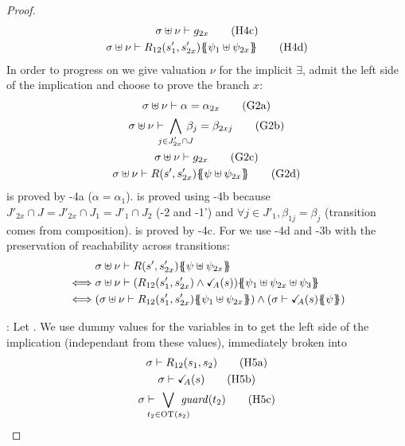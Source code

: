 \documentclass{article}
\begin{document}
\begin{proof}
\begin{gather}
		\sigma \uplus \nu \vdash g_{2x} \hyp{4c} \\
		\sigma \uplus \nu \vdash R_{12}\mpar{s'_1, s'_{2x}}\psubst{\psi_1 \uplus \psi_{2x}} \hyp{4d}
	\end{gather}
	In order to progress on  we give valuation \(\nu\) for the implicit \(\exists\), admit the left side of the implication and choose to prove the branch \(x\):
	\begin{gather}
		\sigma \uplus \nu \vdash \alpha = \alpha_{2x} \goal{2a} \\
		\sigma \uplus \nu \vdash \bigwedge_\subbox{j \in J'_{2x} \cap J} \beta_j = \beta_{2xj} \goal{2b} \\
		\sigma \uplus \nu \vdash g_{2x} \goal{2c} \\
		\sigma \uplus \nu \vdash R\mpar{s', s'_{2x}}\psubst{\psi \uplus \psi_{2x}} \goal{2d}
	\end{gather}
	 is proved by \hyp{4a} (\(\alpha = \alpha_1\)).
	 is proved using \hyp{4b} because \(J'_{2x} \cap J = J'_{2x} \cap J_1 = J'_1 \cap J_2\) (\hyp{2} and \hyp{1'}) and \(\forall j \in J'_1, \beta_{1j} = \beta_j\) (transition comes from composition).
	 is proved by \hyp{4c}.
	For  we use \hyp{4d} and \hyp{3b} with the preservation of reachability across transitions:
	\begin{align*}
		& \sigma \uplus \nu \vdash R\mpar{s', s'_{2x}}\psubst{\psi \uplus \psi_{2x}} \\
		\iff & \sigma \uplus \nu \vdash \mpar{R_{12}\mpar{s'_1, s'_{2x}} \wedge \reach{A}\mpar{s}}\psubst{\psi_1 \uplus \psi_{2x} \uplus \psi_3} \\
		\iff & \mpar{\sigma \uplus \nu \vdash R_{12}\mpar{s'_1, s'_{2x}}\psubst{\psi_1 \uplus \psi_{2x}}} \wedge \mpar{\sigma \vdash \reach{A}\mpar{s}\psubst{\psi}}
	\end{align*}
\item[\goal{1}:]
	Let .
	We use dummy values for the variables in  to get the left side of the implication (independant from these values), immediately broken into
	\begin{gather}
		\sigma \vdash R_{12}\mpar{s_1, s_2} \hyp{5a} \\
		\sigma \vdash \reach{A}\mpar{s} \hyp{5b} \\
		\sigma \vdash \bigvee_\subbox{t_2 \in \fOT{s_2}} \fguard{t_2} \hyp{5c}
	\end{gather}

\end{proof}
\end{document}
